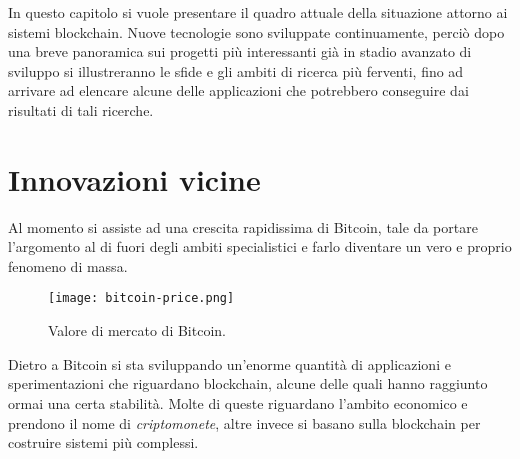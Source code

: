 In questo capitolo si vuole presentare il quadro attuale della situazione attorno ai sistemi blockchain. Nuove tecnologie sono sviluppate continuamente, perciò dopo una breve panoramica sui progetti più interessanti già in stadio avanzato di sviluppo si illustreranno le sfide e gli ambiti di ricerca più ferventi, fino ad arrivare ad elencare alcune delle applicazioni che potrebbero conseguire dai risultati di tali ricerche.

\section{Innovazioni vicine}
    Al momento si assiste ad una crescita rapidissima di Bitcoin, tale da portare l'argomento al di fuori degli ambiti specialistici e farlo diventare un vero e proprio fenomeno di massa.
    \begin{figure}[ht]
        \centering
        \texttt{[image: bitcoin-price.png]}
        \caption[Valore di mercato di Bitcoin]{Valore di mercato di Bitcoin.}
        \label{fig:bitcoin_price}
    \end{figure}
    Dietro a Bitcoin si sta sviluppando un'enorme quantità di applicazioni e sperimentazioni che riguardano blockchain, alcune delle quali hanno raggiunto ormai una certa stabilità. Molte di queste riguardano l'ambito economico e prendono il nome di \emph{criptomonete}, altre invece si basano sulla blockchain per costruire sistemi più complessi.
    
